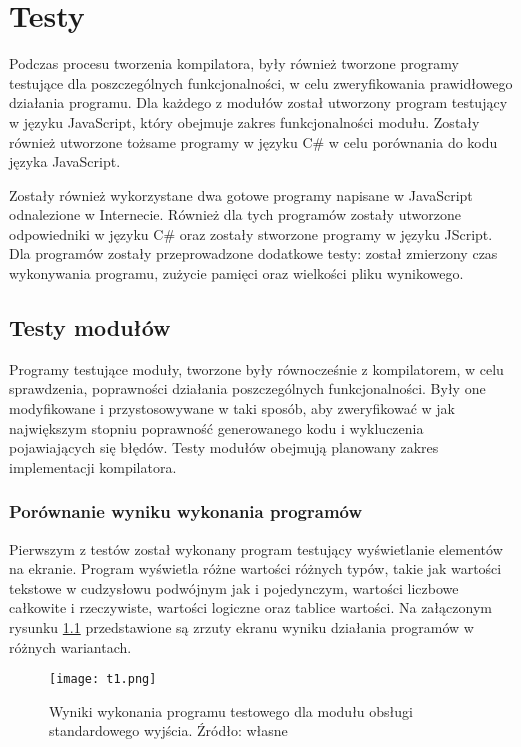 \chapter{Testy}
\label{rozdzial4}

\par Podczas procesu tworzenia kompilatora, były również tworzone programy testujące dla poszczególnych funkcjonalności, w celu zweryfikowania prawidłowego działania programu. Dla każdego z modułów został utworzony program testujący w języku JavaScript, który obejmuje zakres funkcjonalności modułu. Zostały również utworzone tożsame programy w języku C\# w celu porównania do kodu języka JavaScript.
\par Zostały również wykorzystane dwa gotowe programy napisane w JavaScript odnalezione w Internecie. Również dla tych programów zostały utworzone odpowiedniki w języku C\# oraz zostały stworzone programy w języku JScript. Dla programów zostały przeprowadzone dodatkowe testy: został zmierzony czas wykonywania programu, zużycie pamięci oraz wielkości pliku wynikowego.

\section{Testy modułów}

\par Programy testujące moduły, tworzone były równocześnie z kompilatorem, w celu sprawdzenia, poprawności działania poszczególnych funkcjonalności. Były one modyfikowane i przystosowywane w taki sposób, aby zweryfikować w jak największym stopniu poprawność generowanego kodu i wykluczenia pojawiających się błędów. Testy modułów obejmują planowany zakres implementacji kompilatora.

\subsection{Porównanie wyniku wykonania programów}

\par Pierwszym z testów został wykonany program testujący wyświetlanie elementów na ekranie. Program wyświetla różne wartości różnych typów, takie jak wartości tekstowe w cudzysłowu podwójnym jak i pojedynczym, wartości liczbowe całkowite i rzeczywiste, wartości logiczne oraz tablice wartości. Na załączonym rysunku \ref{fig:result1} przedstawione są zrzuty ekranu wyniku działania programów w różnych wariantach.

\begin{figure}[!h]
	\centering
  \texttt{[image: t1.png]}
	\caption{Wyniki wykonania programu testowego dla modułu obsługi standardowego wyjścia. Źródło: własne}
	\label{fig:result1}
\end{figure}


